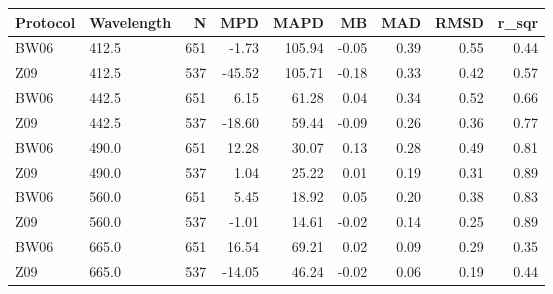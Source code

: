 \begin{tabular}{llrrrrrrr}
\toprule
Protocol & Wavelength &    N &    MPD &   MAPD &    MB &  MAD &  RMSD &  r\_sqr \\
\midrule
    BW06 &      412.5 &  651 &  -1.73 & 105.94 & -0.05 & 0.39 &  0.55 &   0.44 \\
     Z09 &      412.5 &  537 & -45.52 & 105.71 & -0.18 & 0.33 &  0.42 &   0.57 \\
    BW06 &      442.5 &  651 &   6.15 &  61.28 &  0.04 & 0.34 &  0.52 &   0.66 \\
     Z09 &      442.5 &  537 & -18.60 &  59.44 & -0.09 & 0.26 &  0.36 &   0.77 \\
    BW06 &      490.0 &  651 &  12.28 &  30.07 &  0.13 & 0.28 &  0.49 &   0.81 \\
     Z09 &      490.0 &  537 &   1.04 &  25.22 &  0.01 & 0.19 &  0.31 &   0.89 \\
    BW06 &      560.0 &  651 &   5.45 &  18.92 &  0.05 & 0.20 &  0.38 &   0.83 \\
     Z09 &      560.0 &  537 &  -1.01 &  14.61 & -0.02 & 0.14 &  0.25 &   0.89 \\
    BW06 &      665.0 &  651 &  16.54 &  69.21 &  0.02 & 0.09 &  0.29 &   0.35 \\
     Z09 &      665.0 &  537 & -14.05 &  46.24 & -0.02 & 0.06 &  0.19 &   0.44 \\
\bottomrule
\end{tabular}
